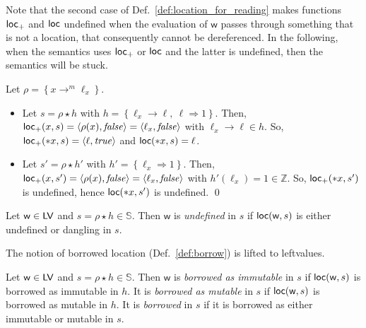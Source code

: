 \noindent
Note that the second case of Def.~\ref{def:location_for_reading}
makes functions $\mathsf{loc_+}$ and $\mathsf{loc}$
undefined when the evaluation of $\mathsf{w}$ passes through something that is not
a location, that consequently cannot be dereferenced.
In the following, when the semantics
uses $\mathsf{loc_+}$ or $\mathsf{loc}$ and the latter is undefined, then the semantics will be stuck.

\begin{example}
  Let $\rho = \left\{x\to^m\ell_x\right\}$.
  \begin{itemize}
    \item Let $s = \rho\star h$ with
    $h = \left\{\ell_x\to\ell,\ \ell\Rightarrow 1\right\}$.
    Then, $\mathsf{loc_+}(x,s)=\langle\rho(x),\mathit{false}\rangle=
    \langle\ell_x,\mathit{false}\rangle$ with $\ell_x\to\ell\in h$.
    So, $\mathsf{loc_+}(*x,s)=\langle \ell,\mathit{true}\rangle$
    and $\mathsf{loc}(\mathtt{*}x,s)= \ell$.
    \item Let $s' = \rho\star h'$ with
    $h' = \left\{\ell_x\Rightarrow 1\right\}$.
    Then, $\mathsf{loc_+}(x,s')=\langle\rho(x),\mathit{false}\rangle=
    \langle\ell_x,\mathit{false}\rangle$ with $h'(\ell_x)=1\in\mathbb{Z}$.
    So, $\mathsf{loc_+}(*x,s')$ is undefined, hence $\mathsf{loc}(\mathtt{*}x,s')$ is undefined.
    \qed
  \end{itemize}
\end{example}

\begin{definition}\label{def:undefined_leftvalues}
  Let $\mathsf{w}\in\mathsf{LV}$ and $s=\rho\star h\in\mathbb{S}$. Then
  $\mathsf{w}$ is \emph{undefined} in $s$ if $\mathsf{loc}(\mathsf{w},s)$ is either undefined
  or dangling in $s$.
\end{definition}



The notion of borrowed location (Def.~\ref{def:borrow}) is lifted to leftvalues.

\begin{definition}\label{def:borrowed_leftvalues}
  Let $\mathsf{w}\in\mathsf{LV}$ and $s=\rho\star h\in\mathbb{S}$. Then
  $\mathsf{w}$ is \emph{borrowed as immutable} in $s$
  if $\mathsf{loc}(\mathsf{w},s)$ is borrowed as
  immutable in $h$. It is \emph{borrowed as mutable} in $s$ if
  $\mathsf{loc}(\mathsf{w},s)$ is borrowed as
  mutable in $h$. It is \emph{borrowed} in $s$
  if it is borrowed as either immutable or mutable in $s$.
\end{definition}

